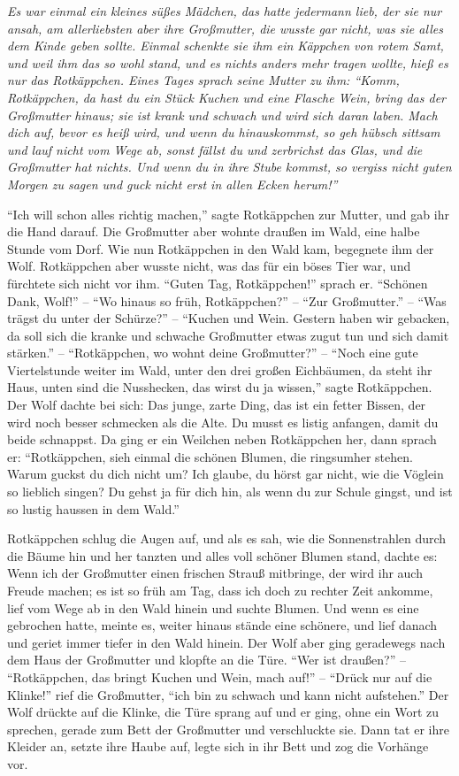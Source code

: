 \documentclass[version=last,paper=A4,fontsize=20pt,DIV=16]{scrartcl}
\newcommand{\gf}[1]{\enquote{\sffamily #1}}
\begin{document}
\linenumbers
\itshape
Es war einmal ein kleines süßes Mädchen, das hatte jedermann lieb, der sie nur ansah, am allerliebsten aber ihre Großmutter, die wusste gar nicht, was sie alles dem Kinde geben sollte. Einmal schenkte sie ihm ein Käppchen von rotem Samt, und weil ihm das so wohl stand, und es nichts anders mehr tragen wollte, hieß es nur das Rotkäppchen. Eines Tages sprach seine Mutter zu ihm: \gf{Komm, Rotkäppchen, da hast du ein Stück Kuchen und eine Flasche Wein, bring das der Großmutter hinaus; sie ist krank und schwach und wird sich daran laben. Mach dich auf, bevor es heiß wird, und wenn du hinauskommst, so geh hübsch sittsam und lauf nicht vom Wege ab, sonst fällst du und zerbrichst das Glas, und die Großmutter hat nichts. Und wenn du in ihre Stube kommst, so vergiss nicht guten Morgen zu sagen und guck nicht erst in allen Ecken herum!}


\gf{Ich will schon alles richtig machen,} sagte Rotkäppchen zur Mutter, und gab ihr die Hand darauf. Die Großmutter aber wohnte draußen im Wald, eine halbe Stunde vom Dorf. Wie nun Rotkäppchen in den Wald kam, begegnete ihm der Wolf. Rotkäppchen aber wusste nicht, was das für ein böses Tier war, und fürchtete sich nicht vor ihm. \gf{Guten Tag, Rotkäppchen!} sprach er. \gf{Schönen Dank, Wolf!} -- \gf{Wo hinaus so früh, Rotkäppchen?} -- \gf{Zur Großmutter.} -- \gf{Was trägst du unter der Schürze?} -- \gf{Kuchen und Wein. Gestern haben wir gebacken, da soll sich die kranke und schwache Großmutter etwas zugut tun und sich damit stärken.} -- \gf{Rotkäppchen, wo wohnt deine Großmutter?} -- \gf{Noch eine gute Viertelstunde weiter im Wald, unter den drei großen Eichbäumen, da steht ihr Haus, unten sind die Nusshecken, das wirst du ja wissen,} sagte Rotkäppchen. Der Wolf dachte bei sich: Das junge, zarte Ding, das ist ein fetter Bissen, der wird noch besser schmecken als die Alte. Du musst es listig anfangen, damit du beide schnappst. Da ging er ein Weilchen neben Rotkäppchen her, dann sprach er: \gf{Rotkäppchen, sieh einmal die schönen Blumen, die ringsumher stehen. Warum guckst du dich nicht um? Ich glaube, du hörst gar nicht, wie die Vöglein so lieblich singen? Du gehst ja für dich hin, als wenn du zur Schule gingst, und ist so lustig haussen in dem Wald.}


Rotkäppchen schlug die Augen auf, und als es sah, wie die Sonnenstrahlen durch die Bäume hin und her tanzten und alles voll schöner Blumen stand, dachte es: Wenn ich der Großmutter einen frischen Strauß mitbringe, der wird ihr auch Freude machen; es ist so früh am Tag, dass ich doch zu rechter Zeit ankomme, lief vom Wege ab in den Wald hinein und suchte Blumen. Und wenn es eine gebrochen hatte, meinte es, weiter hinaus stände eine schönere, und lief danach und geriet immer tiefer in den Wald hinein. Der Wolf aber ging geradewegs nach dem Haus der Großmutter und klopfte an die Türe. \gf{Wer ist draußen?} -- \gf{Rotkäppchen, das bringt Kuchen und Wein, mach auf!} -- \gf{Drück nur auf die Klinke!} rief die Großmutter, \gf{ich bin zu schwach und kann nicht aufstehen.} Der Wolf drückte auf die Klinke, die Türe sprang auf und er ging, ohne ein Wort zu sprechen, gerade zum Bett der Großmutter und verschluckte sie. Dann tat er ihre Kleider an, setzte ihre Haube auf, legte sich in ihr Bett und zog die Vorhänge vor.
\end{document}
